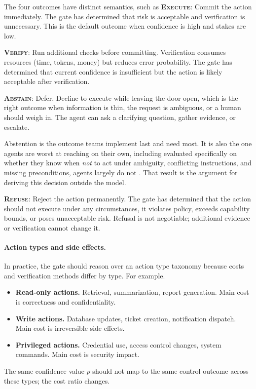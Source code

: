 The four outcomes have distinct semantics, such as \textbf{\textsc{Execute}}: Commit the action immediately. The gate has determined that risk is acceptable and verification is unnecessary. This is the default outcome when confidence is high and stakes are low.

\textbf{\textsc{Verify}}: Run additional checks before committing. Verification consumes resources (time, tokens, money) but reduces error probability. The gate has determined that current confidence is insufficient but the action is likely acceptable after verification.

\textbf{\textsc{Abstain}}: Defer. Decline to execute while leaving the door open,
which is the right outcome when information is thin, the request is ambiguous, or
a human should weigh in. The agent can ask a clarifying question, gather evidence,
or escalate.

Abstention is the outcome teams implement last and need most. It is also the one
agents are worst at reaching on their own, including evaluated specifically on whether they
know when \emph{not} to act under ambiguity, conflicting instructions, and
missing preconditions, agents largely do not \cite{agentabstain2026}. That result
is the argument for deriving this decision outside the model.

\textbf{\textsc{Refuse}}: Reject the action permanently. The gate has determined that the action should not execute under any circumstances, it violates policy, exceeds capability bounds, or poses unacceptable risk. Refusal is not negotiable; additional evidence or verification cannot change it.

\paragraph{Action types and side effects.}
In practice, the gate should reason over an action type taxonomy because costs and verification methods differ by type. For example.
\begin{itemize}
\item \textbf{Read-only actions.} Retrieval, summarization, report generation. Main cost is correctness and confidentiality.
\item \textbf{Write actions.} Database updates, ticket creation, notification dispatch. Main cost is irreversible side effects.
\item \textbf{Privileged actions.} Credential use, access control changes, system commands. Main cost is security impact.
\end{itemize}
The same confidence value $p$ should not map to the same control outcome across these types; the cost ratio changes.

